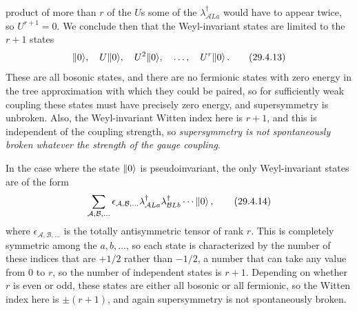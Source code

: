 product of more than \(r\) of the \(U\)s some of the
\(\lambda_{\mathcal A La}^\dagger\) would have to appear twice, so
\(U^{r+1}=0\). We conclude then that the Weyl-invariant states are limited
to the \(r+1\) states
\begin{equation}
  \lVert 0\rangle,\quad U\lVert 0\rangle,\quad U^2\lVert 0\rangle,\quad\ldots,\quad U^r\lVert 0\rangle\,.
  \tag{29.4.13}\label{eq:29.4.13}
\end{equation}
These are all bosonic states, and there are no fermionic states with zero
energy in the tree approximation with which they could be paired, so for
sufficiently weak coupling these states must have precisely zero energy,
and supersymmetry is unbroken. Also, the Weyl-invariant Witten index here
is \(r+1\), and this is independent of the coupling strength, so
\emph{supersymmetry is not spontaneously broken whatever the strength of
the gauge coupling}.

In the case where the state \(\lVert 0\rangle\) is pseudoinvariant, the only
Weyl-invariant states are of the form
\begin{equation}
  \sum_{\mathcal A,\mathcal B,\ldots}
  \epsilon_{\mathcal A,\mathcal B,\ldots}
  \lambda_{\mathcal A La}^\dagger
  \lambda_{\mathcal B Lb}^\dagger
  \cdots\lVert 0\rangle\,,
  \tag{29.4.14}\label{eq:29.4.14}
\end{equation}
where \(\epsilon_{\mathcal A,\mathcal B,\ldots}\) is the totally
antisymmetric tensor of rank \(r\). This is completely symmetric among the
\(a,b,\ldots\), so each state is characterized by the number of these
indices that are \(+1/2\) rather than \(-1/2\), a number that can take any
value from 0 to \(r\), so the number of independent states is \(r+1\).
Depending on whether \(r\) is even or odd, these states are either all
bosonic or all fermionic, so the Witten index here is \(\pm(r+1)\), and
again supersymmetry is not spontaneously broken.

